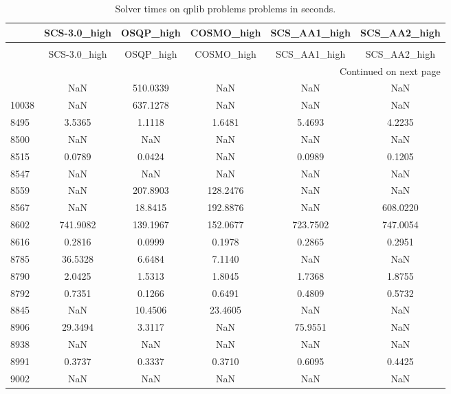 \begin{longtable}{lccccc}
\caption{Solver times on qplib problems problems in seconds.}
\label{t-qplib problems-results}\\
\toprule
{} &  SCS-3.0\_high &  OSQP\_high &  COSMO\_high &  SCS\_AA1\_high &  SCS\_AA2\_high \\
\midrule
\endfirsthead
\caption[]{Solver times on qplib problems problems in seconds.} \\
\toprule
{} &  SCS-3.0\_high &  OSQP\_high &  COSMO\_high &  SCS\_AA1\_high &  SCS\_AA2\_high \\
\midrule
\endhead
\midrule
\multicolumn{6}{r}{{Continued on next page}} \\
\midrule
\endfoot

\bottomrule
\endlastfoot
10034 &           NaN &   510.0339 &         NaN &           NaN &           NaN \\
10038 &           NaN &   637.1278 &         NaN &           NaN &           NaN \\
8495  &        3.5365 &     1.1118 &      1.6481 &        5.4693 &        4.2235 \\
8500  &           NaN &        NaN &         NaN &           NaN &           NaN \\
8515  &        0.0789 &     0.0424 &         NaN &        0.0989 &        0.1205 \\
8547  &           NaN &        NaN &         NaN &           NaN &           NaN \\
8559  &           NaN &   207.8903 &    128.2476 &           NaN &           NaN \\
8567  &           NaN &    18.8415 &    192.8876 &           NaN &      608.0220 \\
8602  &      741.9082 &   139.1967 &    152.0677 &      723.7502 &      747.0054 \\
8616  &        0.2816 &     0.0999 &      0.1978 &        0.2865 &        0.2951 \\
8785  &       36.5328 &     6.6484 &      7.1140 &           NaN &           NaN \\
8790  &        2.0425 &     1.5313 &      1.8045 &        1.7368 &        1.8755 \\
8792  &        0.7351 &     0.1266 &      0.6491 &        0.4809 &        0.5732 \\
8845  &           NaN &    10.4506 &     23.4605 &           NaN &           NaN \\
8906  &       29.3494 &     3.3117 &         NaN &       75.9551 &           NaN \\
8938  &           NaN &        NaN &         NaN &           NaN &           NaN \\
8991  &        0.3737 &     0.3337 &      0.3710 &        0.6095 &        0.4425 \\
9002  &           NaN &        NaN &         NaN &           NaN &           NaN \\
\end{longtable}
